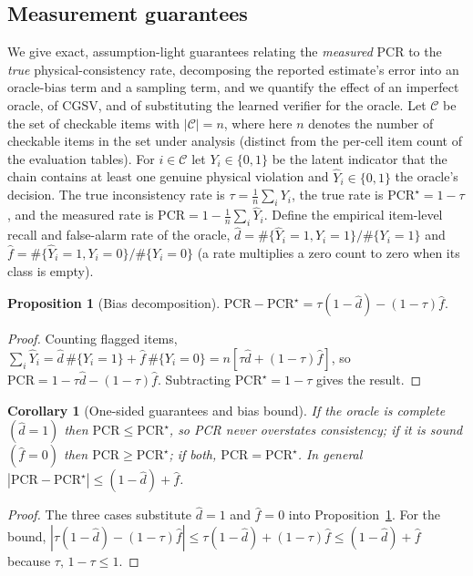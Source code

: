 \documentclass[pdflatex,sn-nature]{sn-jnl}
\newtheorem{proposition}{Proposition}
\newtheorem{corollary}{Corollary}
\begin{document}
\subsection*{Measurement guarantees}
We give exact, assumption-light guarantees relating the \emph{measured} PCR to the
\emph{true} physical-consistency rate, decomposing the reported estimate's error into an
oracle-bias term and a sampling term, and we quantify the effect of an imperfect
oracle, of CGSV, and of substituting the learned verifier for the oracle. Let
$\mathcal{C}$ be the set of checkable items with $|\mathcal{C}|=n$, where here $n$ denotes
the number of checkable items in the set under analysis (distinct from the per-cell item
count of the evaluation tables). For
$i\in\mathcal{C}$ let $Y_i\in\{0,1\}$ be the latent indicator that the chain contains
at least one genuine physical violation and $\hat Y_i\in\{0,1\}$ the oracle's decision.
The true inconsistency rate is $\tau=\frac1n\sum_i Y_i$, the true rate is
$\mathrm{PCR}^\star=1-\tau$, and the measured rate is
$\mathrm{PCR}=1-\frac1n\sum_i\hat Y_i$. Define the empirical item-level recall and
false-alarm rate of the oracle,
$\hat d=\#\{\hat Y_i{=}1,Y_i{=}1\}/\#\{Y_i{=}1\}$ and
$\hat f=\#\{\hat Y_i{=}1,Y_i{=}0\}/\#\{Y_i{=}0\}$ (a rate multiplies a zero
count to zero when its class is empty).

\begin{proposition}[Bias decomposition]\label{prop:bias}
$\mathrm{PCR}-\mathrm{PCR}^\star=\tau(1-\hat d)-(1-\tau)\hat f.$
\end{proposition}
\begin{proof}
Counting flagged items,
$\sum_i\hat Y_i=\hat d\,\#\{Y_i{=}1\}+\hat f\,\#\{Y_i{=}0\}=n[\tau\hat d+(1-\tau)\hat f]$,
so $\mathrm{PCR}=1-\tau\hat d-(1-\tau)\hat f$. Subtracting $\mathrm{PCR}^\star=1-\tau$
gives the result.
\end{proof}

\begin{corollary}[One-sided guarantees and bias bound]\label{cor:onesided}
If the oracle is complete $(\hat d=1)$ then $\mathrm{PCR}\le\mathrm{PCR}^\star$, so PCR
never overstates consistency; if it is sound $(\hat f=0)$ then
$\mathrm{PCR}\ge\mathrm{PCR}^\star$; if both, $\mathrm{PCR}=\mathrm{PCR}^\star$. In
general $|\mathrm{PCR}-\mathrm{PCR}^\star|\le(1-\hat d)+\hat f$.
\end{corollary}
\begin{proof}
The three cases substitute $\hat d=1$ and $\hat f=0$ into
Proposition~\ref{prop:bias}. For the bound,
$|\tau(1-\hat d)-(1-\tau)\hat f|\le\tau(1-\hat d)+(1-\tau)\hat f\le(1-\hat d)+\hat f$
because $\tau,\,1-\tau\le1$.
\end{proof}
\end{document}
